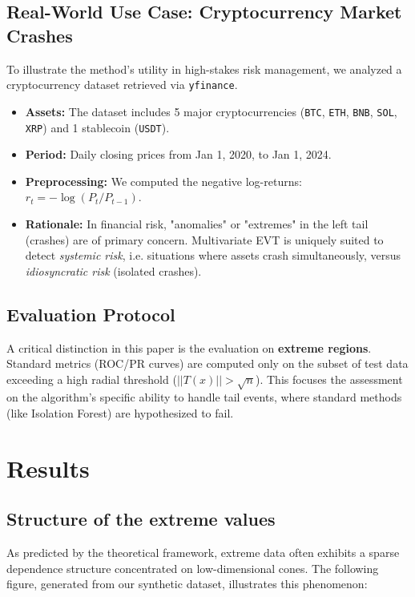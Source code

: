 \documentclass[11pt]{article}
\begin{document}
\subsection{Real-World Use Case: Cryptocurrency Market Crashes}
To illustrate the method's utility in high-stakes risk management, we analyzed a cryptocurrency dataset retrieved via \texttt{yfinance}.
\begin{itemize}
    \item \textbf{Assets:} The dataset includes 5 major cryptocurrencies (\texttt{BTC}, \texttt{ETH}, \texttt{BNB}, \texttt{SOL}, \texttt{XRP}) and 1 stablecoin (\texttt{USDT}).
    \item \textbf{Period:} Daily closing prices from Jan 1, 2020, to Jan 1, 2024.
    \item \textbf{Preprocessing:} We computed the negative log-returns: $r_t = -\log(P_t / P_{t-1})$.
    \item \textbf{Rationale:} In financial risk, "anomalies" or "extremes" in the left tail (crashes) are of primary concern. Multivariate EVT is uniquely suited to detect \textit{systemic risk}, i.e. situations where assets crash simultaneously, versus \textit{idiosyncratic risk} (isolated crashes).
\end{itemize}

\subsection{Evaluation Protocol}
A critical distinction in this paper is the evaluation on \textbf{extreme regions}. Standard metrics (ROC/PR curves) are computed only on the subset of test data exceeding a high radial threshold ($||T(x)|| > \sqrt{n}$). This focuses the assessment on the algorithm's specific ability to handle tail events, where standard methods (like Isolation Forest) are hypothesized to fail.


\section{Results}

\subsection{Structure of the extreme values}
As predicted by the theoretical framework, extreme data often exhibits a sparse dependence structure concentrated on low-dimensional cones. 
The following figure, generated from our synthetic dataset, illustrates this phenomenon:
\end{document}
